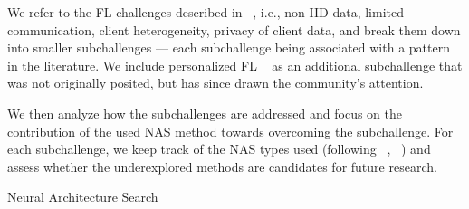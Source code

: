 We refer to the FL challenges described in ~\cite{fl_seminal_2017}, i.e., non-IID data, limited communication, client heterogeneity, privacy of client data, and break them down into smaller subchallenges — each subchallenge being associated with a pattern in the literature. We include personalized FL ~\cite{personalized_fl_2023} as an additional subchallenge that was not originally posited, but has since drawn the community's attention. 

We then analyze how the subchallenges are addressed and focus on the contribution of the used NAS method towards overcoming the subchallenge. For each subchallenge, we keep track of the NAS types used (following ~\cite{nas_1000_papers_2023}, ~\cite{systematic_nas_survey_2024}) and assess whether the underexplored methods are candidates for future research.




Neural Architecture Search  